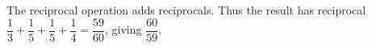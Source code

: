 The reciprocal operation adds reciprocals. Thus the result has reciprocal $\dfrac{1}{3}+\dfrac{1}{5}+\dfrac{1}{5}+\dfrac{1}{4}=\dfrac{59}{60}$, giving $\boxed{\dfrac{60}{59}}$.
